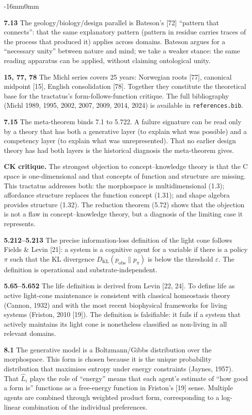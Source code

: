 \documentclass[10pt,oneside]{book}
\newenvironment{widebody}{%
  \begin{adjustwidth}{-16mm}{0mm}%
}{%
  \end{adjustwidth}%
}
\begin{document}
\begin{widebody}
{\textbf{7.13} The geology/biology/design parallel is Bateson's [72] ``pattern that connects'': that the same explanatory pattern (pattern in residue carries traces of the process that produced it) applies across domains. Bateson argues for a ``necessary unity'' between nature and mind; we take a weaker stance: the same reading apparatus can be applied, without claiming ontological unity.

\textbf{15, 77, 78} The Michl series covers 25 years: Norwegian roots [77], canonical midpoint [15], English consolidation [78]. Together they constitute the theoretical base for the tractatus's form-follows-function critique. The full bibliography (Michl 1989, 1995, 2002, 2007, 2009, 2014, 2024) is available in \texttt{references.bib}.

\textbf{7.15} The meta-theorem binds 7.1 to 5.722. A failure signature can be read only by a theory that has both a generative layer (to explain what was possible) and a competency layer (to explain what was unrepresented). That no earlier design theory has had both layers is the historical diagnosis the meta-theorem gives.

\textbf{CK critique.} The strongest objection to concept--knowledge theory is that the C space is one-dimensional and that concepts of function and structure are missing. This tractatus addresses both: the morphospace is multidimensional (1.3); affordance structure replaces the function concept (1.31); and shape algebra provides structure (1.32). The reduction theorem (5.72) shows that the objection is not a flaw in concept--knowledge theory, but a diagnosis of the limiting case it represents.

\bigskip
\textbf{5.212--5.213} The precise information-loss definition of the light cone follows Fields \& Levin [21]: a system is a cognitive agent for a variable if there is a policy \(\pi\) such that the KL divergence \(D_{\mathrm{KL}}(p_{\mathrm{obs}} \| p_{\pi})\) is below the threshold \(\varepsilon\). The definition is operational and substrate-independent.

\textbf{5.65--5.652} The life definition is derived from Levin [22, 24]. To define life as active light-cone maintenance is consistent with classical homeostasis theory (Cannon, 1932) and with the most recent biophysical frameworks for living systems (Friston, 2010 [19]). The definition is falsifiable: it fails if a system that actively maintains its light cone is nonetheless classified as non-living in all relevant domains.

\textbf{8.1} The generative model is a Boltzmann/Gibbs distribution over the morphospace. This form is chosen because it is the unique probability distribution that maximises entropy under energy constraints (Jaynes, 1957). That \(\hat{L}_i\) plays the role of ``energy'' means that each agent's estimate of ``how good a form is'' functions as a free-energy function in Friston's [19] sense. Multiple agents are combined through weighted product form, corresponding to a log-linear combination of the individual preferences.

}
\end{widebody}
\end{document}
